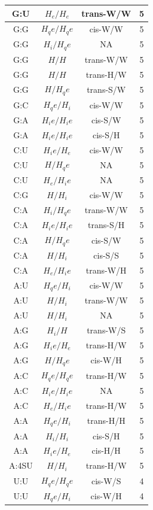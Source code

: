 \begin{center}
\begin{longtable}{c|c|c|c}
G:U & $H_e/H_e$ & trans-W/W & 5 \\  \hline
G:G & $H_qe/H_qe$ & cis-W/W & 5 \\  \hline
G:G & $H_i/H_qe$ & NA & 5 \\  \hline
G:G & $H/H$ & trans-W/W & 5 \\  \hline
G:G & $H/H$ & trans-H/W & 5 \\  \hline
G:G & $H/H_qe$ & trans-S/W & 5 \\  \hline
G:C & $H_qe/H_i$ & cis-W/W & 5 \\  \hline
G:A & $H_ie/H_ie$ & cis-S/W & 5 \\  \hline
G:A & $H_ie/H_ie$ & cis-S/H & 5 \\  \hline
C:U & $H_ie/H_e$ & cis-W/W & 5 \\  \hline
C:U & $H/H_qe$ & NA & 5 \\  \hline
C:U & $H_e/H_ie$ & NA & 5 \\  \hline
C:G & $H/H_i$ & cis-W/W & 5 \\  \hline
C:A & $H_i/H_qe$ & trans-W/W & 5 \\  \hline
C:A & $H_ie/H_ie$ & trans-S/H & 5 \\  \hline
C:A & $H/H_qe$ & cis-S/W & 5 \\  \hline
C:A & $H/H_i$ & cis-S/S & 5 \\  \hline
C:A & $H_e/H_ie$ & trans-W/H & 5 \\  \hline
A:U & $H_qe/H_i$ & cis-W/W & 5 \\  \hline
A:U & $H/H_i$ & trans-W/W & 5 \\  \hline
A:U & $H/H_i$ & NA & 5 \\  \hline
A:G & $H_i/H$ & trans-W/S & 5 \\  \hline
A:G & $H_ie/H_e$ & trans-H/W & 5 \\  \hline
A:G & $H/H_qe$ & cis-W/H & 5 \\  \hline
A:C & $H_qe/H_qe$ & trans-H/W & 5 \\  \hline
A:C & $H_ie/H_ie$ & NA & 5 \\  \hline
A:C & $H_e/H_ie$ & trans-H/W & 5 \\  \hline
A:A & $H_qe/H_i$ & trans-H/H & 5 \\  \hline
A:A & $H_i/H_i$ & cis-S/H & 5 \\  \hline
A:A & $H_ie/H_e$ & cis-H/H & 5 \\  \hline
A:4SU & $H/H_i$ & trans-H/W & 5 \\  \hline
U:U & $H_qe/H_qe$ & cis-W/S & 4 \\  \hline
U:U & $H_qe/H_i$ & cis-W/H & 4 \\  \hline

\end{longtable}
\end{center}
